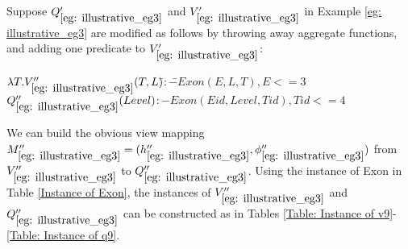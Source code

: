 \begin{example}\label{eg: conditions_conjunctive}
Suppose $Q_{\ref{eg: illustrative_eg3}}'$ and $V_{\ref{eg: illustrative_eg3}}'$ in Example \ref{eg: illustrative_eg3} are modified as follows by throwing away aggregate functions, and adding one predicate to $V_{\ref{eg: illustrative_eg3}}'$:
\begin{tabbing}
$\lambda T. V_{\ref{eg: illustrative_eg3}}''(T, L)$\hspace{2em}\=$:-$\=$ Exon(E, L, T), E <= 3$\\
$Q_{\ref{eg: illustrative_eg3}}''(Level) $\>$:- Exon(Eid, Level, Tid), Tid <= 4$
\end{tabbing}



We can build the obvious view mapping $M_{\ref{eg: illustrative_eg3}}'' = (h_{\ref{eg: illustrative_eg3}}'', \phi_{\ref{eg: illustrative_eg3}}'')$ from $V_{\ref{eg: illustrative_eg3}}''$ to $Q_{\ref{eg: illustrative_eg3}}''$. Using the instance of Exon in Table \ref{Instance of Exon}, the instances of $V_{\ref{eg: illustrative_eg3}}''$ and $Q_{\ref{eg: illustrative_eg3}}''$ can be constructed as in Tables \ref{Table: Instance of v9}-\ref{Table: Instance of q9}. 


\end{example}
